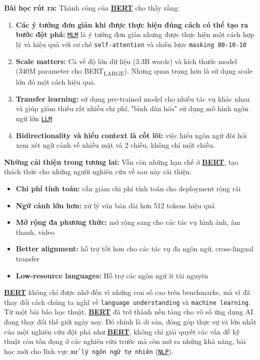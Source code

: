\textbf{Bài học rút ra:}
Thành công của \hyperref[acro:bert]{\textbf{BERT}} cho thấy rằng:
\begin{enumerate}
    \item \textbf{Các ý tưởng đơn giản khi được thực hiện đúng cách có thể tạo ra bước đột phá:} \hyperref[acro:mlm]{\texttt{MLM}} là ý tưởng đơn giản nhưng được thực hiện một cách hợp lý và hiệu quả với cơ chế \texttt{self-attention} và chiến lược \texttt{masking 80-10-10}
    
    \item \textbf{Scale matters:} Cả về độ lớn dữ liệu (3.3B words) và kích thước model (340M parameter cho BERT\textsubscript{LARGE}). Nhưng quan trọng hơn là sử dụng scale lớn đó một cách hiệu quả.
    
    \item \textbf{Transfer learning:} sử dụng pre-trained model cho nhiều tác vụ khác nhau và giúp giảm thiếu rất nhiều chi phí, "bình dân hóa" sử dụng mô hình ngôn ngữ lớn \hyperref[acro:llm]{\texttt{LLM}}
    
    \item \textbf{Bidirectionality và hiểu context là cốt lõi:} việc hiểu ngôn ngữ đòi hỏi xem xét ngữ cảnh về nhiều mặt và 2 chiều, không chỉ một chiều.
\end{enumerate}

\textbf{Những cải thiện trong tương lai:}
Vẫn còn những hạn chế ở \hyperref[acro:bert]{\textbf{BERT}}, tạo thách thức cho những người nghiên cứu về sau này cải thiện:
\begin{itemize}
    \item \textbf{Chi phí tính toán:} cần giảm chi phí tính toán cho deployment rộng rãi
    \item \textbf{Ngữ cảnh lớn hơn:} xử lý văn bản dài hơn 512 tokens hiệu quả
    \item \textbf{Mở rộng đa phương thức:} mở rộng sang cho các tác vụ hình ảnh, âm thanh, video
    \item \textbf{Better alignment:} hỗ trợ tốt hơn cho các tác vụ đa ngôn ngữ, cross‑lingual transfer
    \item \textbf{Low-resource languages:} Hỗ trợ các ngôn ngữ ít tài nguyên
\end{itemize}

\hyperref[acro:bert]{\textbf{BERT}} không chỉ được nhớ đến vì những con số cao trên benchmarks, mà vì đã thay đổi cách chúng ta nghĩ về \texttt{language understanding} và \texttt{machine learning}. Từ một bài báo học thuật, \hyperref[acro:bert]{\textbf{BERT}} đã trở thành nền tảng cho vô số ứng dụng AI đang thay đổi thế giới ngày nay. Đó chính là di sản, đóng góp thực sự và lớn nhất của một nghiên cứu đột phá như \hyperref[acro:bert]{\textbf{BERT}}, không chỉ giải quyết các vấn đề kỹ thuật còn tồn đọng ở các nghiên cứu trước mà còn mở ra những khả năng, bài học mới cho lĩnh vực \texttt{xử lý ngôn ngữ tự nhiên} (\hyperref[acro:nlp]{\texttt{NLP}}).